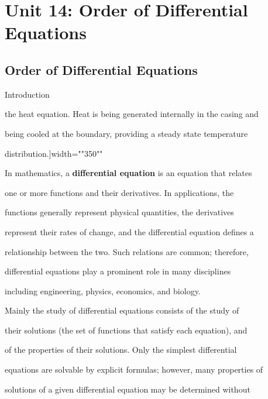 \chapter{Unit 14: Order of Differential Equations}
\label{chap:unit14}

\section{Order of Differential Equations}
\label{sec:order-of-differential-equations}

Introduction




the heat equation. Heat is being generated internally in the casing and

being cooled at the boundary, providing a steady state temperature

distribution.]{width=""350""}

In mathematics, a \textbf{differential equation} is an equation that relates

one or more functions and their derivatives. In applications, the

functions generally represent physical quantities, the derivatives

represent their rates of change, and the differential equation defines a

relationship between the two. Such relations are common; therefore,

differential equations play a prominent role in many disciplines

including engineering, physics, economics, and biology.



Mainly the study of differential equations consists of the study of

their solutions (the set of functions that satisfy each equation), and

of the properties of their solutions. Only the simplest differential

equations are solvable by explicit formulas; however, many properties of

solutions of a given differential equation may be determined without

